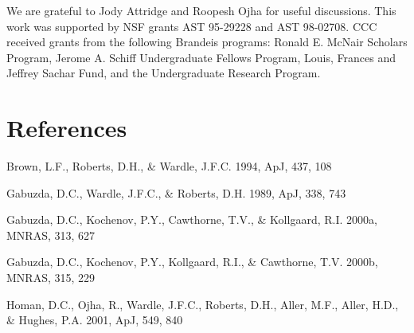 \documentclass[twoside]{article}
\begin{document}
We are grateful to Jody Attridge and Roopesh Ojha for useful discussions.
This work was supported by NSF grants AST 95-29228 and AST 98-02708. CCC
received grants from the following Brandeis programs: Ronald E. McNair
Scholars Program, Jerome A. Schiff Undergraduate Fellows Program, Louis,
Frances and Jeffrey Sachar Fund, and the Undergraduate Research Program.

\section{References}

Brown, L.F., Roberts, D.H., \& Wardle, J.F.C. 1994, ApJ, 437, 108

Gabuzda, D.C., Wardle, J.F.C., \& Roberts, D.H. 1989, ApJ, 338, 743

Gabuzda, D.C., Kochenov, P.Y., Cawthorne, T.V., \& Kollgaard, R.I. 2000a,
MNRAS, 313, 627

Gabuzda, D.C., Kochenov, P.Y., Kollgaard, R.I., \& Cawthorne, T.V. 2000b,
MNRAS, 315, 229

Homan, D.C., Ojha, R., Wardle, J.F.C., Roberts, D.H., Aller, M.F., Aller,
H.D., \& Hughes, P.A. 2001, ApJ, 549, 840
\end{document}

